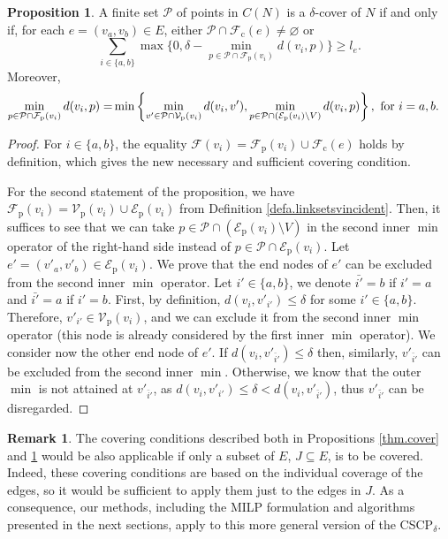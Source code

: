 \documentclass[review]{elsarticle}
\newcommand{\cF}{{\mathcal F}}
\newcommand{\cE}{{\mathcal E}}
\newcommand{\cP}{{\mathcal P}}
\newcommand{\cV}{{\mathcal V}}
\newcommand{\dlt}{{\delta}}
\newcommand{\problem}{CSCP$_\dlt$}
\theoremstyle{definition}
\newtheorem{proposition}{Proposition}[section]
\newtheorem{remark}{Remark}[section]
\begin{document}
\begin{proposition}
\label{cora.covercond}
A finite set $\cP$ of points in $C(N)$  is a $\dlt$-cover of $N$ if and only if,
for each $e=(v_a,v_b) \in E$, either $\cP \cap \cF_{\mathrm{c}}(e) \ne \varnothing$ or
\begin{equation}
\label{eqa.coverdistfull}
	\sum_{i \in \{a,b\}} \max \big\{0,\dlt -  \min_{p \in   \cP \cap \cF_{\mathrm{p}}(v_i)} d( v_{i}, p)\big \} \ge l_e.
\end{equation}
Moreover,
\begin{equation}\nonumber
\begin{split}
\min_{p \in \cP \cap \cF_{\mathrm{p}}(v_i)}d(v_{i}, p)
   = &\min \left\{\min_{v' \in \cP \cap \cV_{\mathrm{p}}(v_i)} d(v_{i}, v'), \min_{p \in  \cP \cap (\cE_{\mathrm{p}}(v_i)\setminus  V)}  d(v_{i}, p) \right\}, \textup{ for } i=a,b.
\end{split}
\end{equation}
\end{proposition}
\begin{proof}
For $i \in \{a,b\}$, the equality $\cF(v_i)=\cF_{\mathrm{p}}(v_i)\cup\cF_{\mathrm{c}}(e)$ holds by definition, which gives the new necessary and sufficient covering condition.

For the second statement of the proposition, we have $\cF_{\mathrm{p}}(v_i)=\cV_{\mathrm{p}}(v_i)\cup \cE_{\mathrm{p}}(v_i)$ from Definition \ref{defa.linksetsvincident}. Then, it suffices to see that we can take $p \in  \cP \cap (\cE_{\mathrm{p}}(v_i)\setminus  V)$ in the second inner $\min$ operator of the right-hand side instead of $p \in  \cP \cap \cE_{\mathrm{p}}(v_i)$. Let $e'=(v'_a,v'_b)\in  \cE_{\mathrm{p}}(v_i)$. We prove that the end nodes of $e'$ can be excluded from the second inner $\min$ operator.  Let $i' \in \{a,b\}$, we denote $\bar{i'}=b$ if $i'=a$ and $\bar{i'}=a$ if $i'=b$.  First, by definition, $d(v_i,v'_{i'})\leq \dlt$ for some $i'\in\{a,b\}$. Therefore, $v'_{i'}\in \cV_{\mathrm{p}}(v_i)$, and we can exclude it from the second inner $\min$ operator (this node is already considered by the first inner $\min$ operator). We consider now the other end node of $e'$. If $d(v_i,v'_{\bar i'})\leq \dlt$ then, similarly, $v'_{\bar{i}'}$ can be excluded from the second inner $\min$. Otherwise, we know that the outer $\min$ is not attained at $v'_{\bar i'}$, as  $d(v_i,v'_{i'})\leq \dlt < d(v_i,v'_{\bar i'})$, thus $v'_{\bar i'}$ can be disregarded.
\end{proof}

\begin{remark}
The covering conditions described both in Propositions \ref{thm.cover} and \ref{cora.covercond} would be also applicable if only a subset of $E$, $J\subseteq E$, is to be covered. Indeed, these covering conditions are based on the individual coverage of the edges, so it would be sufficient to apply them just to the edges in $J$. As a consequence, our methods, including the MILP formulation and algorithms presented in the next sections, apply to this more general version of the \problem.
\end{remark}
\end{document}
